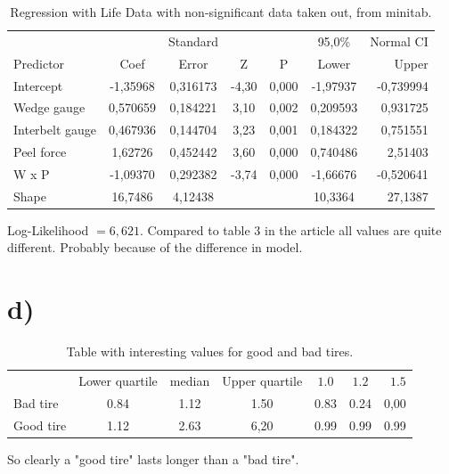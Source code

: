 \documentclass[10pt, a4paper]{article}
\begin{document}
\begin{table}[h!]
\centering

\begin{tabular}{ l c c c c c r }

                   &          & Standard &          &    &  95,0\% & Normal CI\\
Predictor   &           Coef  &    Error &     Z    &  P &     Lower  &    Upper\\
Intercept   &     -1,35968  &0,316173 & -4,30&  0,000&  -1,97937 & -0,739994\\
Wedge gauge &     0,570659 & 0,184221 &  3,10&  0,002&  0,209593 &  0,931725\\
Interbelt gauge&  0,467936 & 0,144704 &  3,23&  0,001&  0,184322 &  0,751551\\
Peel force     &   1,62726 & 0,452442 &  3,60&  0,000&  0,740486 &   2,51403\\
W x P          &  -1,09370 & 0,292382 & -3,74&  0,000&  -1,66676 & -0,520641\\
Shape          &   16,7486 &  4,12438 &      &       &   10,3364 &   27,1387\\


\end{tabular}
\caption{Regression with Life Data with non-significant data taken out, from minitab.}
   \label{rep}
\end{table}
Log-Likelihood $= 6,621$.
Compared to table 3 in the article all values are quite different. Probably because of the difference in model.

\section*{d)}

\begin{table}[h!]
\centering

\begin{tabular}{ l c c c c c r }
& Lower quartile & median & Upper quartile & $1.0$ & $1.2$&$1.5$\\
Bad tire& 0.84 & 1.12 & 1.50 & 0.83 & 0.24 & 0,00\\
Good tire & 1.12 & 2.63 & 6,20 & 0.99 & 0.99 & 0.99\\

\end{tabular}
\caption{Table with interesting values for good and bad tires.}
   \label{expe}
\end{table}
So clearly a "good tire" lasts longer than a "bad tire".
\end{document}
